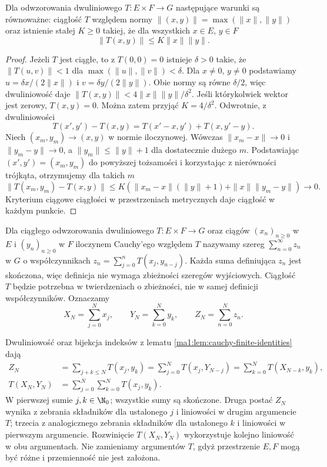 \begin{lemat}
\label{ma2:lem:bilinear-bound}
Dla odwzorowania dwuliniowego $T:E\times F\to G$
następujące warunki są równoważne: ciągłość $T$ względem
normy $\|(x,y)\|=\max(\|x\|,\|y\|)$ oraz istnienie
stałej $K\ge0$ takiej, że dla wszystkich $x\in E$, $y\in F$
\[
 \|T(x,y)\|\le K\|x\|\|y\|.
\]
\end{lemat}
\begin{proof}
Jeżeli $T$ jest ciągłe, to z $T(0,0)=0$ istnieje
$\delta>0$ takie, że $\|T(u,v)\|<1$ dla
$\max(\|u\|,\|v\|)<\delta$. Dla $x\ne0$, $y\ne0$
podstawiamy $u=\delta x/(2\|x\|)$ i $v=\delta y/(2\|y\|)$.
Obie normy są równe $\delta/2$, więc dwuliniowość daje
$\|T(x,y)\|<4\|x\|\|y\|/\delta^2$.
Jeśli którykolwiek wektor jest zerowy, $T(x,y)=0$.
Można zatem przyjąć $K=4/\delta^2$.
Odwrotnie, z dwuliniowości
\[
 T(x',y')-T(x,y)=T(x'-x,y')+T(x,y'-y).
\]
Niech $(x_m,y_m)\to(x,y)$ w normie iloczynowej.
Wówczas $\|x_m-x\|\to0$ i $\|y_m-y\|\to0$,
a $\|y_m\|\le\|y\|+1$ dla dostatecznie dużego $m$.
Podstawiając $(x',y')=(x_m,y_m)$ do powyższej
tożsamości i korzystając z nierówności trójkąta,
otrzymujemy dla takich $m$
\[
 \|T(x_m,y_m)-T(x,y)\|
 \le K(\|x_m-x\|(\|y\|+1)+\|x\|\|y_m-y\|)
 \longrightarrow0.
\]
Kryterium ciągowe ciągłości w przestrzeniach metrycznych
daje ciągłość w każdym punkcie.
\end{proof}

\begin{definicja}
\label{ma2:def:bilinear-cauchy}
Dla ciągłego odwzorowania dwuliniowego $T:E\times F\to G$
oraz ciągów $(x_n)_{n\ge0}$ w $E$ i $(y_n)_{n\ge0}$ w $F$
iloczynem Cauchy'ego względem $T$ nazywamy szereg
$\sum_{n=0}^{\infty}z_n$ w $G$ o współczynnikach
$z_n=\sum_{j=0}^n T(x_j,y_{n-j})$.
Każda suma definiująca $z_n$ jest skończona, więc
definicja nie wymaga zbieżności szeregów wyjściowych.
Ciągłość $T$ będzie potrzebna w twierdzeniach o zbieżności,
nie w samej definicji współczynników.
Oznaczamy
\[
 X_N=\sum_{j=0}^N x_j,\qquad Y_N=\sum_{k=0}^N y_k,\qquad
 Z_N=\sum_{n=0}^N z_n.
\]
\end{definicja}
Dwuliniowość oraz bijekcja indeksów z lematu
\ref{ma1:lem:cauchy-finite-identities} dają
\[
\begin{aligned}
 Z_N&=\sum_{j+k\le N}T(x_j,y_k)
 =\sum_{j=0}^N T(x_j,Y_{N-j})
 =\sum_{k=0}^N T(X_{N-k},y_k),\\
 T(X_N,Y_N)&=\sum_{j=0}^N\sum_{k=0}^N T(x_j,y_k).
\end{aligned}
\]
W pierwszej sumie $j,k\in\N_0$; wszystkie sumy są skończone.
Druga postać $Z_N$ wynika z zebrania składników dla
ustalonego $j$ i liniowości w drugim argumencie $T$;
trzecia z analogicznego zebrania składników dla ustalonego
$k$ i liniowości w pierwszym argumencie. Rozwinięcie
$T(X_N,Y_N)$ wykorzystuje kolejno liniowość w obu argumentach.
Nie zamieniamy argumentów $T$, gdyż przestrzenie $E,F$
mogą być różne i przemienność nie jest założona.

